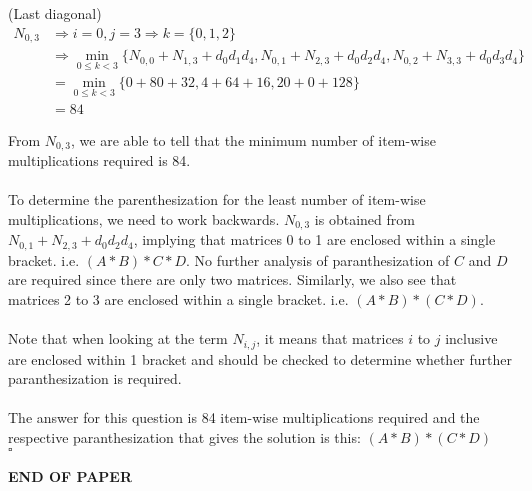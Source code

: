 \documentclass[12pt]{article}
\newcommand{\EOQ}{\hfill $\square$}
\begin{document}
\noindent (Last diagonal)
\begin{equation*}
\begin{split}
N_{0,3}&\Rightarrow i=0, j=3 \Rightarrow k=\{0,1,2\} \\&\Rightarrow \min_{0\leq k<3}\{N_{0,0}+N_{1,3}+d_0d_1d_4,N_{0,1}+N_{2,3}+d_0d_2d_4,N_{0,2}+N_{3,3}+d_0d_3d_4\}\\
&=\min_{0\leq k<3}\{0+80+32,4+64+16,20+0+128\}\\
&=84
\end{split}
\end{equation*}
\begin{figure}[H]
\centering
{}
\end{figure}
\noindent From $N_{0,3}$, we are able to tell that the minimum number of item-wise multiplications required is 84.\\\\To determine the parenthesization for the least number of item-wise multiplications, we need to work backwards.
$N_{0,3}$ is obtained from $N_{0,1}+N_{2,3}+d_0d_2d_4$, implying that matrices 0 to 1 are enclosed within a single bracket. i.e. $(A\ast B)\ast C \ast D$. No further analysis of paranthesization of $C$ and $D$ are required since there are only two matrices. Similarly, we also see that matrices 2 to 3 are enclosed within a single bracket. i.e. $(A\ast B)\ast (C \ast D)$.\\\\Note that when looking at the term $N_{i,j}$, it means that matrices $i$ to $j$ inclusive are enclosed within 1 bracket and should be checked to determine whether further paranthesization is required.\\\\
The answer for this question is 84 item-wise multiplications required and the respective paranthesization that gives the solution is this: $(A\ast B)\ast (C \ast D)$\\\mbox{}\EOQ
\bigskip
\vfill
\begin{center}{\bf END OF PAPER}\end{center}
\end{document}
